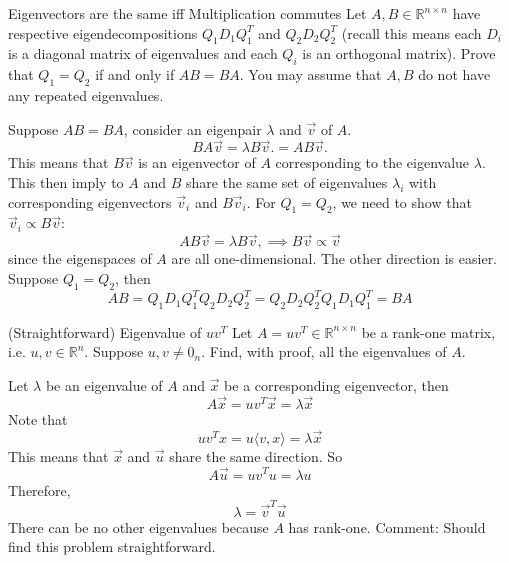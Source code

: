 \documentclass[../main]{subfiles}
\begin{document}
\begin{bbox}{Eigenvectors are the same iff Multiplication commutes}
    Let $A,B\in \mathbb R^{n\times n}$ have respective eigendecompositions $Q_1 D_1Q_1^T$ and $Q_2 D_2 Q_2^T$ (recall this means each $D_i$ is a diagonal matrix of eigenvalues and each $Q_i$ is an orthogonal matrix). Prove that $Q_1 = Q_2$ if and only if $AB = BA$. You may assume that $A, B$ do not have any repeated eigenvalues.
\end{bbox}
\begin{solution}
    Suppose $AB = BA$, consider an eigenpair $\lambda$ and $\vec v$ of $A$. 
    \[
    BA \vec v = \lambda B\vec v. = AB\vec v.
    \]
    This means that $B\vec v$ is an eigenvector of $A$ corresponding to the eigenvalue $\lambda$. This then imply to $A$ and $B$ share the same set of eigenvalues $\lambda_i$ with corresponding eigenvectors $\vec v_i$ and $B\vec v_i$. For $Q_1 = Q_2$, we need to show that $\vec v_i \propto B\vec v$: 
    \[
    A B\vec v = \lambda B\vec v, \implies B\vec v \propto \vec v
    \] since the eigenspaces of $A$ are all one-dimensional.
    \newline
    The other direction is easier. Suppose $Q_1 = Q_2$, then 
    \[
    AB = Q_1 D_1 Q_1^T Q_2 D_2 Q_2^T = Q_2 D_2 Q_2^TQ_1 D_1 Q_1^T = BA
    \]
\end{solution}
\begin{bbox}{(Straightforward) Eigenvalue of $uv^T$}
    Let $A = uv^T \in \mathbb R^{n\times n}$ be a rank-one matrix, i.e. $u, v \in \mathbb R^n$. Suppose $u,v \neq 0_n$. Find, with proof, all the eigenvalues of $A$.
\end{bbox}
\begin{solution}
    Let $\lambda$ be an eigenvalue of $A$ and $\vec x$ be a corresponding eigenvector, then 
    \[
    A \vec x= uv^T \vec x = \lambda \vec x 
    \]
    Note that 
    \[ 
    u v^T x = u \langle v, x\rangle = \lambda \vec x
    \]
    This means that $\vec x$ and $\vec u$ share the same direction. So 
    \[
    A \vec u = u v^T u = \lambda u
    \]
    Therefore, 
    \[
    \lambda = \vec v^T \vec u
    \]
    There can be no other eigenvalues because $A$ has rank-one.
    \newline
    Comment: Should find this problem straightforward.

\end{solution}
\end{document}
